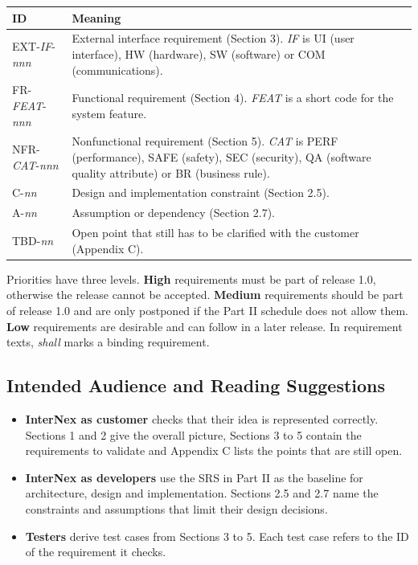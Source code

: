 \documentclass[11pt, a4paper]{article}
\begin{document}
\begin{tabularx}{\textwidth}{|p{3.6cm}|X|}
    \hline
    \textbf{ID} & \textbf{Meaning} \\
    \hline\hline
    EXT-\textit{IF}-\textit{nnn} & External interface requirement (Section 3). \textit{IF} is UI (user interface), HW (hardware), SW (software) or COM (communications). \\
    \hline
    FR-\textit{FEAT}-\textit{nnn} & Functional requirement (Section 4). \textit{FEAT} is a short code for the system feature. \\
    \hline
    NFR-\textit{CAT}-\textit{nnn} & Nonfunctional requirement (Section 5). \textit{CAT} is PERF (performance), SAFE (safety), SEC (security), QA (software quality attribute) or BR (business rule). \\
    \hline
    C-\textit{nn} & Design and implementation constraint (Section 2.5). \\
    \hline
    A-\textit{nn} & Assumption or dependency (Section 2.7). \\
    \hline
    TBD-\textit{nn} & Open point that still has to be clarified with the customer (Appendix C). \\
    \hline
\end{tabularx}

Priorities have three levels. \textbf{High} requirements must be part of release 1.0, otherwise the release cannot be accepted. \textbf{Medium} requirements should be part of release 1.0 and are only postponed if the Part II schedule does not allow them. \textbf{Low} requirements are desirable and can follow in a later release. In requirement texts, \emph{shall} marks a binding requirement.

\subsection{Intended Audience and Reading Suggestions}
\begin{itemize}
    \item \textbf{InterNex as customer} checks that their idea is represented correctly. Sections 1 and 2 give the overall picture, Sections 3 to 5 contain the requirements to validate and Appendix C lists the points that are still open.
    \item \textbf{InterNex as developers} use the SRS in Part II as the baseline for architecture, design and implementation. Sections 2.5 and 2.7 name the constraints and assumptions that limit their design decisions.
    \item \textbf{Testers} derive test cases from Sections 3 to 5. Each test case refers to the ID of the requirement it checks.
\end{itemize}
\end{document}
